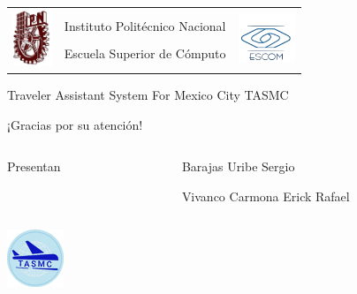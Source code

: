 \documentclass[12pt]{beamer}
\begin{document}
\begin{frame}
	\begin{center}
	\begin{minipage}[t]{0.73\textwidth}	
		\begin{tabular}{ccc}
			\multirow{4}{*}{\includegraphics[height=1.7cm]{imagenes/ipn.png}} &
			&
     	 	\multirow{4}{*}{\includegraphics[height=1.5cm]{imagenes/escom.png}} \\
      		& Instituto Politécnico Nacional & \\
      		& Escuela Superior de Cómputo & \\
      		&&\\
		\end{tabular}
	\end{minipage}
	\end{center}
	
	\begin{center}
		\textcolor[RGB]{0,0,204}{\Large Traveler Assistant System For Mexico City TASMC}
	\end{center}		
	
	\begin{center}
		\Large ¡Gracias por su atención!
	\end{center}
	
	\begin{columns} 
		\begin{column}{0.1cm}
			Presentan
		\end{column}
		\begin{column}{6cm} 
			Barajas Uribe Sergio

			Vivanco Carmona Erick Rafael
		\end{column} 
	\end{columns}	
	\begin{center}
		\includegraphics[height=1.7cm]{imagenes/logo.png}
	\end{center}		
\end{frame}
\end{document}
